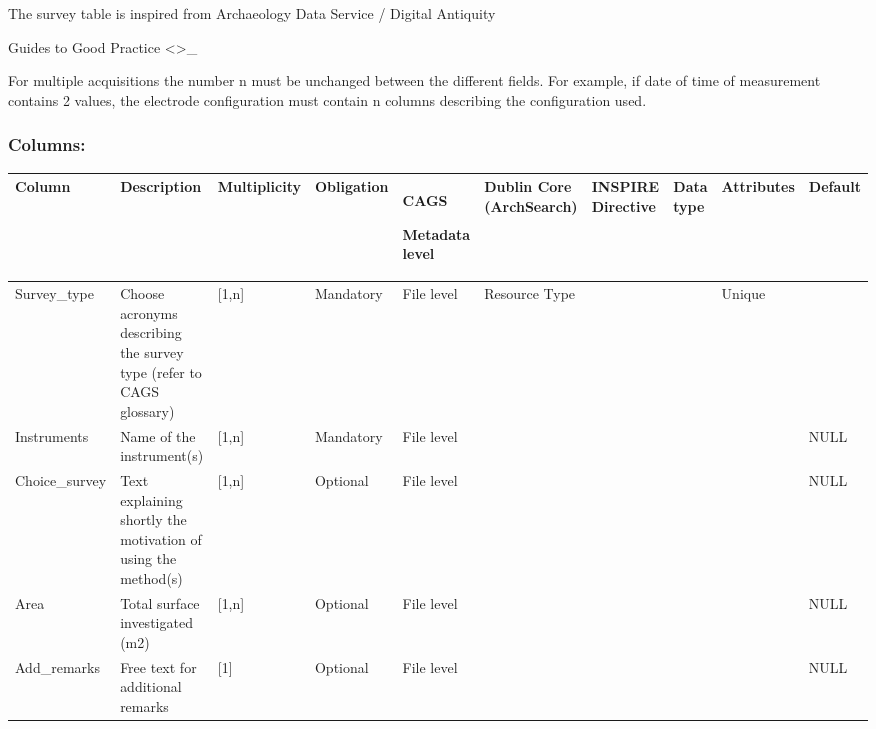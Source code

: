 \documentclass[letterpaper,10pt,english]{sphinxmanual}
\begin{document}
The survey table is inspired from \textasciigrave{}Archaeology Data Service / Digital
Antiquity

Guides to Good Practice
\textless{}\textgreater{}\textasciigrave{}\_

For multiple acquisitions the number n must be unchanged between the
different fields. For example, if date of time of measurement contains 2
values, the electrode configuration must contain n columns describing
the configuration used.


\subsubsection{Columns:}
\label{\detokenize{schema_documentation:columns-1}}\label{\detokenize{schema_documentation:id19}}

\begin{savenotes}\sphinxattablestart
\centering
\begin{tabulary}{\linewidth}[t]{|T|T|T|T|T|T|T|T|T|T|}
\hline
\sphinxstyletheadfamily 
Column
&\sphinxstyletheadfamily 
Description
&\sphinxstyletheadfamily 
Multiplicity
&\sphinxstyletheadfamily 
Obligation
&\sphinxstyletheadfamily 
CAGS

Metadata   level
&\sphinxstyletheadfamily 
Dublin   Core (ArchSearch)
&\sphinxstyletheadfamily 
INSPIRE   Directive
&\sphinxstyletheadfamily 
Data   type
&\sphinxstyletheadfamily 
Attributes
&\sphinxstyletheadfamily 
Default
\\
\hline
Survey\_type
&
Choose acronyms describing the survey   type (refer to CAGS glossary)
&
{[}1,n{]}
&
Mandatory
&
File level
&
Resource Type
&&&
Unique
&\\
\hline
Instruments
&
Name of the instrument(s)
&
{[}1,n{]}
&
Mandatory
&
File level
&&&&&
NULL
\\
\hline
Choice\_survey
&
Text explaining shortly the motivation of   using the method(s)
&
{[}1,n{]}
&
Optional
&
File level
&&&&&
NULL
\\
\hline
Area
&
Total surface investigated (m2)
&
{[}1,n{]}
&
Optional
&
File level
&&&&&
NULL
\\
\hline
Add\_remarks
&
Free text for additional remarks
&
{[}1{]}
&
Optional
&
File level
&&&&&
NULL
\\
\hline
\end{tabulary}
\par
\sphinxattableend\end{savenotes}
\end{document}
